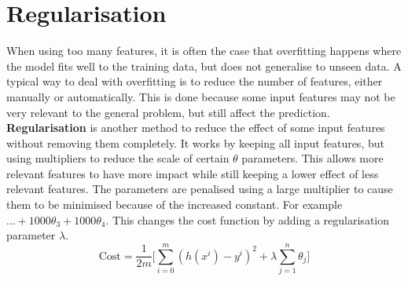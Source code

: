 \documentclass[CS5104-Notes.tex]{subfiles}
\begin{document}
\section{Regularisation}
When using too many features, it is often the case that overfitting happens where the model fits well to the training data, but does not generalise to unseen data. A typical way to deal with overfitting is to reduce the number of features, either manually or automatically. This is done because some input features may not be very relevant to the general problem, but still affect the prediction. 
\n
\textbf{Regularisation} is another method to reduce the effect of some input features without removing them completely. It works by keeping all input features, but using multipliers to reduce the scale of certain $\theta$ parameters. This allows more relevant features to have more impact while still keeping a lower effect of less relevant features. The parameters are penalised using a large multiplier to cause them to be minimised because of the increased constant. For example $... + 1000\theta_{3} + 1000\theta_{4}$. This changes the cost function by adding a regularisation parameter $\lambda$.
\begin{equation}
\text{Cost} = \frac{1}{2m}\bigg[\sum_{i=0}^{m}(h(x^{i}) - y^{i})^{2} + \lambda \sum_{j=1}^{n}\theta_{j} \bigg]
\end{equation}
\end{document}
